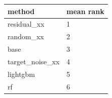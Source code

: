 \begin{tabular}{ll}
\toprule
method & mean rank \\
\midrule
residual\_xx & 1 \\
random\_xx & 2 \\
base & 3 \\
target\_noise\_xx & 4 \\
lightgbm & 5 \\
rf & 6 \\
\bottomrule
\end{tabular}

